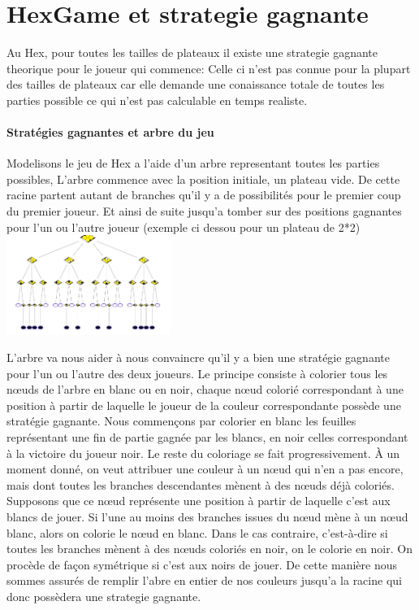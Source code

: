 \section{HexGame et strategie gagnante}

Au Hex, pour toutes les tailles de plateaux il existe une strategie gagnante theorique pour le joueur qui commence:
Celle ci n'est pas connue pour la plupart des tailles de plateaux car elle demande une conaissance totale de toutes 
les parties possible ce qui n'est pas calculable en temps realiste.

\paragraph{Stratégies gagnantes et arbre du jeu}
Modelisons le jeu de Hex a l'aide d'un arbre representant toutes les parties possibles, L'arbre commence avec la position 
initiale, un plateau vide. De cette racine partent autant de branches qu'il y a de possibilités pour 
le premier coup du premier joueur. Et ainsi de suite jusqu'a tomber sur des positions gagnantes pour l'un ou l'autre joueur
(exemple ci dessou pour un plateau de 2*2)
\includegraphics[width=0.4\textwidth]{root/strategie_gagnante.png}

L'arbre va nous aider à nous convaincre qu'il y a bien une stratégie gagnante pour l'un ou l'autre
des deux joueurs. Le principe consiste à colorier tous les nœuds de l'arbre en blanc ou en noir, chaque
nœud colorié correspondant à une position à partir de laquelle le joueur de la couleur correspondante
possède une stratégie gagnante. 
Nous commençons par colorier en blanc les feuilles représentant une fin de
partie gagnée par les blancs, en noir celles correspondant à la victoire du joueur noir.
Le reste du coloriage se fait progressivement. À un moment donné, on veut attribuer une couleur
à un nœud qui n'en a pas encore, mais dont toutes les branches descendantes mènent à des nœuds
déjà coloriés. Supposons que ce nœud représente une position à partir de laquelle c'est aux blancs de
jouer. Si l'une au moins des branches issues du nœud mène à un nœud blanc, alors on colorie le nœud
en blanc. Dans le cas contraire, c'est-à-dire si toutes les branches mènent à des nœuds coloriés en
noir, on le colorie en noir. On procède de façon symétrique si c'est aux noirs de jouer.
De cette manière nous sommes assurés de remplir l'abre en entier de nos couleurs jusqu'a la racine
qui donc possèdera une strategie gagnante.


